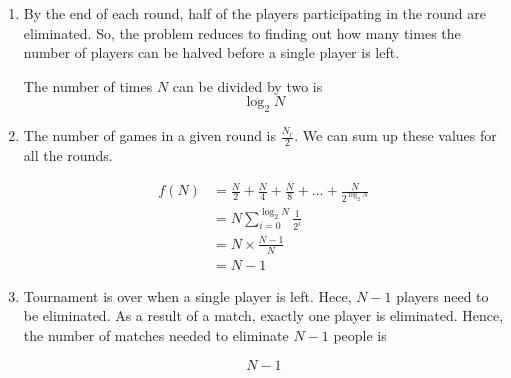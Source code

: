 \begin{enumerate}[label=(\alph*)]
\item By the end of each round, half of the players participating in the round 
are eliminated. So, the problem reduces to finding out how many times the number 
of players can be halved before a single player is left.

  The number of times $N$ can be divided by two is $$\log_{2}{N}$$

\item The number of games in a given round is $\frac{N_{r}}{2}$. We can sum up 
these values for all the rounds.

  \begin{equation} 
  \begin{split}
   f(N) & = \frac{N}{2} + \frac{N}{4}  + \frac{N}{8} + \dots + \frac{N}{2^{\log_{2}{N}}}\\
   & =N \sum_{i=0}^{\log_{2}{N}} \frac{1}{2^{i}}\\
   & =N \times \frac{N-1}{N}\\
   & =N-1
  \end{split}
  \end{equation} 

\item Tournament is over when a single player is left. Hece, $N-1$ players 
need to be eliminated. As a result of a match, exactly one player is eliminated. 
Hence, the number of matches needed to eliminate $N-1$ people is

  $$ N-1 $$
\end{enumerate}